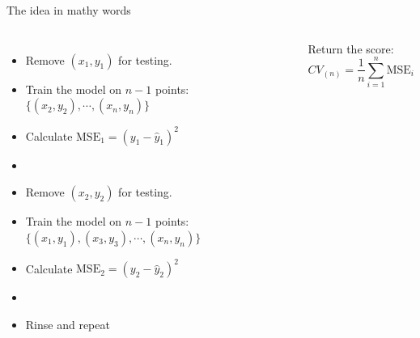 \documentclass[aspectratio=169,,dvipsnames]{beamer}
\begin{document}
\begin{frame}[c]{The idea in mathy words}

\begin{columns}
\centering
\begin{itemize}
	\item Remove $(x_1,y_1)$ for testing.
	\item Train the model on $n-1$ points: $\{(x_2,y_2), \cdots, (x_n,y_n)\}$
	\item Calculate $\mathrm{MSE}_1 = (y_1-\hat y_1)^2$
	\item[]
	\item Remove $(x_2,y_2)$ for testing.
	\item Train the model on $n-1$ points: $\{(x_1,y_1),(x_3,y_3), \cdots, (x_n,y_n)\}$
	\item Calculate $\mathrm{MSE}_2 = (y_2-\hat y_2)^2$
	\item []
	\item Rinse and repeat
\end{itemize}
\centering

Return the score:
\begin{equation*}
	CV_{(n)} = \frac{1}{n}\sum_{i=1}^n \mathrm{MSE}_i
\end{equation*}
\end{columns}

\end{frame}
\end{document}
